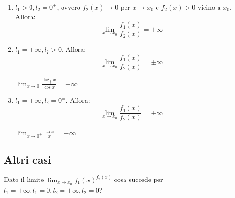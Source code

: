 \begin{enumerate}[label=\textbf{\arabic*})]
        \item $l_1>0, l_2=0^+$, ovvero $f_2(x)\to 0$ per $x\to x_0$ e $f_2(x)>0$ vicino a $x_0$. Allora:
        \begin{equation}
            \lim_{x\to x_0}\frac{f_1(x)}{f_2(x)}=+\infty
        \end{equation}
    
        \item $l_1=\pm\infty, l_2>0$. Allora:
        \begin{equation}
            \lim_{x\to x_0}\frac{f_1(x)}{f_2(x)}=\pm\infty
        \end{equation}
        \begin{example}
            $\lim_{x\to 0}\frac{\log_{\frac{1}{2}}x}{\cos x}=+\infty$
        \end{example}
        
        \item $l_1=\pm\infty, l_2=0^{\pm}$. Allora:
        \begin{equation}
            \lim_{x\to x_0}\frac{f_1(x)}{f_2(x)}=\pm\infty
        \end{equation}
        \begin{example}
            $\lim_{x\to 0^+}\frac{\ln x}{x}=-\infty$
        \end{example}
        
    \end{enumerate}
    

\subsection*{Altri casi}
Dato il limite $\lim_{x\to x_0}f_1(x)^{f_2(x)}$ cosa succede per $l_1=\pm\infty, l_1=0, l_2=\pm\infty, l_2=0$?

